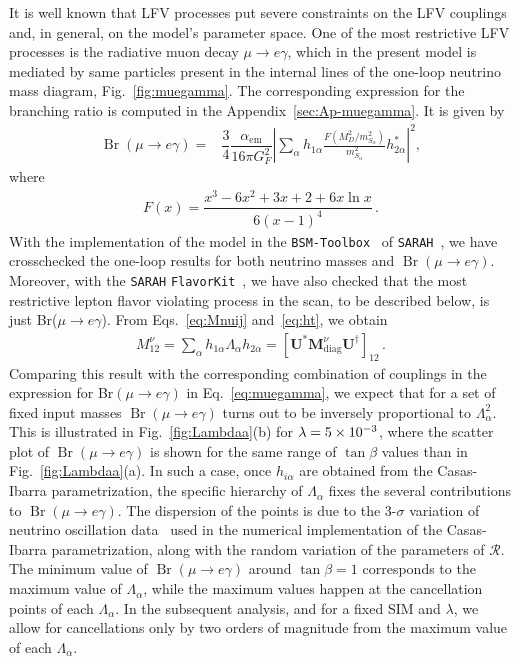 It is well known that LFV processes put severe constraints on the LFV
couplings and, in general, on the model's parameter space. 
One of the most restrictive LFV processes is the radiative muon decay
$\mu\to e\gamma$, which in the present model is mediated by same
particles present in the internal lines of the one-loop neutrino mass
diagram, Fig.~\ref{fig:muegamma}. 
The corresponding expression for the branching ratio is computed in the Appendix~\ref{sec:Ap-muegamma}. It is given by
%
\begin{align}
\label{eq:muegamma}
\operatorname{Br}(\mu \rightarrow e \gamma)=&\dfrac{3}{4}\dfrac{\alpha_{\text{em}}}{16 \pi G_F^2}\left|\sum_{\alpha}
h_{1\alpha}\frac{F\left(M_D^2/m_{S_{\alpha}}^2  \right) }{m_{S_\alpha}^2}h_{2\alpha}^{*}  \right|^2 ,
\end{align}
where
\begin{align}
F(x)=\dfrac{x^3-6x^2+3x+2+6x\ln x}{6(x-1)^4}\,.
\end{align}
%
With the implementation of the model in the
\texttt{BSM-Toolbox}~\cite{Staub:2011dp} of
\texttt{SARAH}~\cite{Staub:2008uz,Staub:2013tta}, we have crosschecked
the one-loop results for both neutrino masses and $\operatorname{Br}(\mu
\rightarrow e \gamma)$.
Moreover, with the \texttt{SARAH}
\texttt{FlavorKit}~\cite{Porod:2014xia}, we have also checked that the
most restrictive lepton flavor violating process in the scan, to be
described below, is just Br($\mu\to e\gamma$).
%
From Eqs.~\eqref{eq:Mnuij} and~\eqref{eq:ht}, we obtain
\begin{align}
  M^{\nu}_{12}=\sum_{\alpha} h_{1\alpha} \Lambda_{\alpha}
  h_{2\alpha}=\left[ \mathbf{U}^{*}\mathbf{M}^{\nu}_{\text{diag}}\mathbf{U}^{\dagger} \right]_{12}\,.%
\end{align}
Comparing this result with the corresponding combination of couplings
in the expression for Br$(\mu\to e\gamma)$ in Eq.~\eqref{eq:muegamma},
we expect that for a set of fixed input masses $\operatorname{Br}(\mu
\rightarrow e \gamma)$ turns out to be inversely proportional to
$\Lambda_\alpha^2$.
This is illustrated in Fig.~\ref{fig:Lambdaa}(b)
for $\lambda=\num{5E-3}$, where the scatter plot of
$\operatorname{Br}(\mu\to e \gamma)$ is shown for the same range of $\tan\beta$ values 
 than in Fig.~\ref{fig:Lambdaa}(a).  In such a case, once
$h_{i\alpha}$ are obtained from the Casas-Ibarra parametrization, the
specific hierarchy of $\Lambda_{\alpha}$ fixes the several contributions
to $\operatorname{Br}(\mu \rightarrow e \gamma)$.  The dispersion of
the points is due to the 3-$\sigma$ variation of neutrino oscillation
data~\cite{Forero:2014bxa} used in the numerical implementation of the Casas-Ibarra
 parametrization, along with the random variation of the parameters of
$\boldsymbol{\mathcal{R}}$. The minimum value of
$\operatorname{Br}(\mu \rightarrow e \gamma)$ around $\tan\beta=1$
corresponds to the maximum value of $\Lambda_{\alpha}$, while the
maximum values happen at the cancellation points of each
$\Lambda_{\alpha}$. In the subsequent analysis, and for a fixed SIM and $\lambda$, we allow 
for cancellations only by two orders of magnitude from the maximum
value of each $\Lambda_{\alpha}$. 

